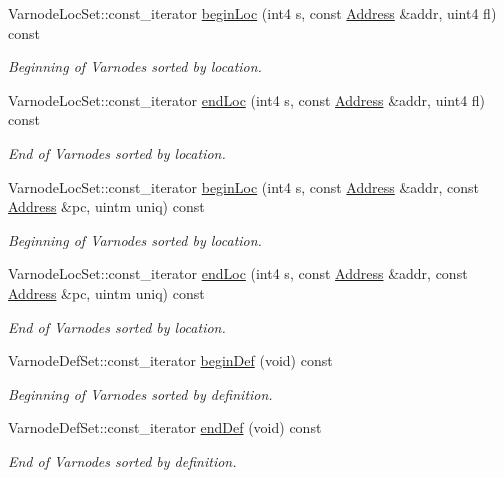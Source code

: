 \begin{DoxyCompactItemize}
Varnode\+Loc\+Set\+::const\+\_\+iterator \mbox{\hyperlink{class_varnode_bank_aea9169bdd43c3e81e16757c4a3a8b03a}{begin\+Loc}} (int4 s, const \mbox{\hyperlink{class_address}{Address}} \&addr, uint4 fl) const
\begin{DoxyCompactList}\small\item\em Beginning of Varnodes sorted by location. \end{DoxyCompactList}\item 
Varnode\+Loc\+Set\+::const\+\_\+iterator \mbox{\hyperlink{class_varnode_bank_a71bad5566277bed12953f025937a0a9e}{end\+Loc}} (int4 s, const \mbox{\hyperlink{class_address}{Address}} \&addr, uint4 fl) const
\begin{DoxyCompactList}\small\item\em End of Varnodes sorted by location. \end{DoxyCompactList}\item 
Varnode\+Loc\+Set\+::const\+\_\+iterator \mbox{\hyperlink{class_varnode_bank_a7ae63dd4a024cc425c1457529202c956}{begin\+Loc}} (int4 s, const \mbox{\hyperlink{class_address}{Address}} \&addr, const \mbox{\hyperlink{class_address}{Address}} \&pc, uintm uniq) const
\begin{DoxyCompactList}\small\item\em Beginning of Varnodes sorted by location. \end{DoxyCompactList}\item 
Varnode\+Loc\+Set\+::const\+\_\+iterator \mbox{\hyperlink{class_varnode_bank_a419ca31b8891185aea76f56ac0fe7437}{end\+Loc}} (int4 s, const \mbox{\hyperlink{class_address}{Address}} \&addr, const \mbox{\hyperlink{class_address}{Address}} \&pc, uintm uniq) const
\begin{DoxyCompactList}\small\item\em End of Varnodes sorted by location. \end{DoxyCompactList}\item 
Varnode\+Def\+Set\+::const\+\_\+iterator \mbox{\hyperlink{class_varnode_bank_a93884ad8b00531125e028acbb910aacc}{begin\+Def}} (void) const
\begin{DoxyCompactList}\small\item\em Beginning of Varnodes sorted by definition. \end{DoxyCompactList}\item 
Varnode\+Def\+Set\+::const\+\_\+iterator \mbox{\hyperlink{class_varnode_bank_a47fdb654fdb22a784fe2d4924ea7d75d}{end\+Def}} (void) const
\begin{DoxyCompactList}\small\item\em End of Varnodes sorted by definition. \end{DoxyCompactList}\item 

\end{DoxyCompactItemize}

